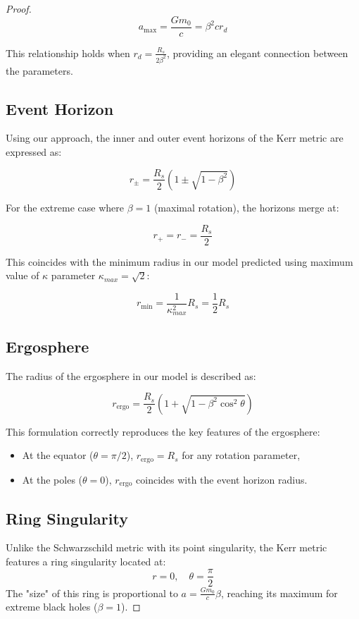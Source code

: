 \documentclass{article}
\begin{document}
\begin{proof}
\[
a_{\max} = \frac{G m_0}{c} = \beta^2 c r_{d}
\]

This relationship holds when \(r_{d} = \frac{R_s}{2 \beta^2}\), providing an elegant connection between the parameters.

\subsection{Event Horizon}
Using our approach, the inner and outer event horizons of the Kerr metric are expressed as:

\[
r_{\pm} = \frac{R_s}{2} \left(1 \pm \sqrt{1 - \beta^2}\right)
\]

For the extreme case where \(\beta = 1\) (maximal rotation), the horizons merge at:

\[
r_{+} = r_{-} = \frac{R_s}{2}
\]

This coincides with the minimum radius in our model predicted using maximum value of $\kappa$ parameter $\kappa_{max}=\sqrt{2}$:

\[
r_{\min} = \frac{1}{\kappa_{max}^2} R_s = \frac{1}{2} R_s
\]

\subsection{Ergosphere}
The radius of the ergosphere in our model is described as:

\[
r_{\text{ergo}} = \frac{R_s}{2} \left(1 + \sqrt{1 - \beta^2 \cos^2 \theta}\right)
\]

This formulation correctly reproduces the key features of the ergosphere:
\begin{itemize}
    \item At the equator (\(\theta = \pi / 2\)), \(r_{\text{ergo}} = R_s\) for any rotation parameter,
    \item At the poles (\(\theta = 0\)), \(r_{\text{ergo}}\) coincides with the event horizon radius.
\end{itemize}

\subsection{Ring Singularity}
Unlike the Schwarzschild metric with its point singularity, the Kerr metric features a ring singularity located at:
\[
r = 0, \quad \theta = \frac{\pi}{2}
\]
The "size" of this ring is proportional to \(a = \frac{G m_0}{c} \beta\), reaching its maximum for extreme black holes (\(\beta = 1\)).


\end{proof}
\end{document}

